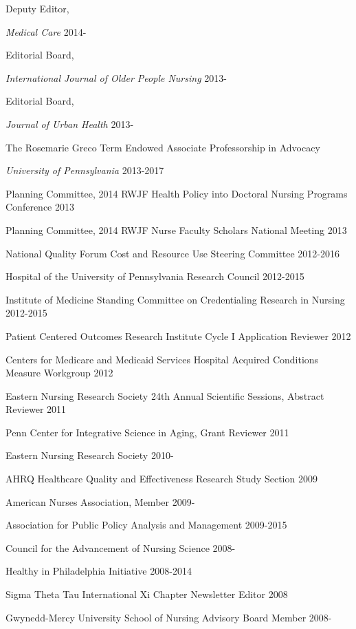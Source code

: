 \documentclass[10pt,]{article}
\begin{document}
{{{{{{{{{{{{{{{Deputy Editor, {\textit {Medical Care} \hfill {2014-{\small{}}} 

Editorial Board, {\textit {International Journal of Older People Nursing} \hfill {2013-{\small{}}}	

Editorial Board, {\textit {Journal of Urban Health} \hfill {2013-{\small{}}}	

The Rosemarie Greco Term Endowed Associate Professorship in Advocacy {\textit {University of Pennsylvania} \hfill 2013-2017 

Planning Committee, 2014 RWJF Health Policy into Doctoral Nursing Programs Conference \hfill 2013 

Planning Committee, 2014 RWJF Nurse Faculty Scholars National Meeting \hfill 2013 

National Quality Forum Cost and Resource Use Steering Committee \hfill 2012-2016 

Hospital of the University of Pennsylvania Research Council \hfill 2012-2015 

Institute of Medicine Standing Committee on Credentialing Research in Nursing \hfill 2012-2015 

Patient Centered Outcomes Research Institute Cycle I Application Reviewer \hfill 2012 

Centers for Medicare and Medicaid Services Hospital Acquired Conditions Measure Workgroup \hfill 2012 

Eastern Nursing Research Society 24th Annual Scientific Sessions, Abstract Reviewer \hfill 2011 

Penn Center for Integrative Science in Aging, Grant Reviewer  \hfill 2011 

Eastern Nursing Research Society \hfill {2010-{\small{}}}

AHRQ Healthcare Quality and Effectiveness Research Study Section \hfill 2009	

American Nurses Association, Member \hfill {2009-{\small{}}}

Association for Public Policy Analysis and Management \hfill 2009-2015

Council for the Advancement of Nursing Science \hfill {2008-{\small{}}}

Healthy in Philadelphia Initiative \hfill 2008-2014

Sigma Theta Tau International Xi Chapter Newsletter Editor \hfill 2008 

Gwynedd-Mercy University School of Nursing Advisory Board Member \hfill {2008-{\small{}}} 

}}}}}}}}}}}}}}}}}}}
\end{document}
